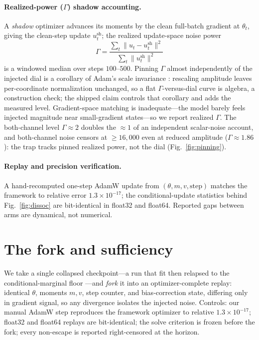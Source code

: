 \documentclass[10pt]{article}
\begin{document}
\paragraph{Realized-power ($\Gamma$) shadow accounting.}
A \emph{shadow} optimizer advances its moments by the clean full-batch gradient at $\theta_t$, giving the clean-step update $u^{\mathrm{sh}}_t$; the realized update-space noise power
\[
\Gamma=\frac{\sum_t\lVert u_t-u^{\mathrm{sh}}_t\rVert^2}{\sum_t\lVert u^{\mathrm{sh}}_t\rVert^2}
\]
is a windowed median over steps $100$--$500$. Pinning $\Gamma$ almost independently of the injected dial is a corollary of Adam's scale invariance \citep{adam}: rescaling amplitude leaves per-coordinate normalization unchanged, so a flat $\Gamma$-versus-dial curve is algebra, a construction check; the shipped claim controls that corollary and adds the measured level. Gradient-space matching is inadequate---the model barely feels injected magnitude near small-gradient states---so we report realized $\Gamma$. The both-channel level $\Gamma\!\approx\!2$ doubles the $\approx\!1$ of an independent scalar-noise account, and both-channel noise censors at $\ge16{,}000$ even at reduced amplitude ($\Gamma\!\approx\!1.86$): the trap tracks pinned realized power, not the dial (Fig.~\ref{fig:pinning}).

\paragraph{Replay and precision verification.}
A hand-recomputed one-step AdamW update from $(\theta,m,v,\text{step})$ matches the framework to relative error $1.3\times10^{-17}$; the conditional-update statistics behind Fig.~\ref{fig:dissoc} are bit-identical in float32 and float64. Reported gaps between arms are dynamical, not numerical.


\section{The fork and sufficiency}
\label{sec:fork}

We take a single collapsed checkpoint---a run that fit then relapsed to the conditional-marginal floor \citep{antigrok}---and \emph{fork} it into an optimizer-complete replay: identical $\theta$, moments $m,v$, step counter, and bias-correction state, differing only in gradient signal, so any divergence isolates the injected noise. Controls: our manual AdamW \citep{adam} step reproduces the framework optimizer to relative $1.3\times10^{-17}$; float32 and float64 replays are bit-identical; the solve criterion is frozen before the fork; every non-escape is reported right-censored at the horizon.
\end{document}
